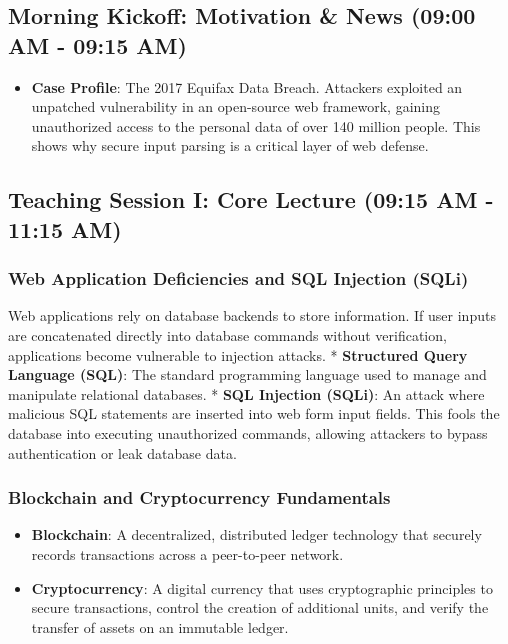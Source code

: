 \documentclass[12pt,openany]{book}
\begin{document}
\medskip

\subsection*{Morning Kickoff: Motivation \& News (09:00 AM - 09:15 AM)}


\begin{itemize}

  \item \textbf{Case Profile}: The 2017 Equifax Data Breach. Attackers exploited an unpatched vulnerability in an open-source web framework, gaining unauthorized access to the personal data of over 140 million people. This shows why secure input parsing is a critical layer of web defense.

\end{itemize}

\medskip

\subsection*{Teaching Session I: Core Lecture (09:15 AM - 11:15 AM)}


\subsubsection*{Web Application Deficiencies and SQL Injection (SQLi)}


Web applications rely on database backends to store information. If user inputs are concatenated directly into database commands without verification, applications become vulnerable to injection attacks.
* \textbf{Structured Query Language (SQL)}: The standard programming language used to manage and manipulate relational databases.
* \textbf{SQL Injection (SQLi)}: An attack where malicious SQL statements are inserted into web form input fields. This fools the database into executing unauthorized commands, allowing attackers to bypass authentication or leak database data.


\subsubsection*{Blockchain and Cryptocurrency Fundamentals}


\begin{itemize}

  \item \textbf{Blockchain}: A decentralized, distributed ledger technology that securely records transactions across a peer-to-peer network.

  \item \textbf{Cryptocurrency}: A digital currency that uses cryptographic principles to secure transactions, control the creation of additional units, and verify the transfer of assets on an immutable ledger.

\end{itemize}
\end{document}
